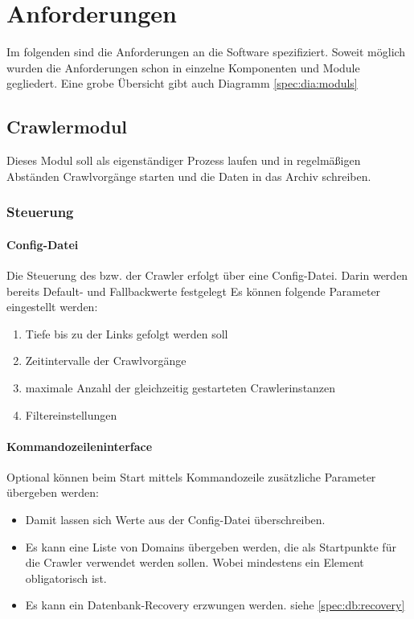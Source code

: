 \chapter{Anforderungen}
Im folgenden sind die Anforderungen an die Software spezifiziert. Soweit möglich wurden
die Anforderungen schon in einzelne Komponenten und Module gegliedert. Eine grobe Übersicht gibt auch Diagramm \ref{spec:dia:moduls}
\section{Crawlermodul}
Dieses Modul soll als eigenständiger Prozess laufen und in regelmäßigen Abständen Crawlvorgänge starten
und die Daten in das Archiv schreiben.

\subsection{Steuerung} \label{spec:req:crawler:control}
	\subsubsection{Config-Datei} \label{spec:req:crawler:control:config} 
		Die Steuerung des bzw. der Crawler erfolgt über eine Config-Datei.
		Darin werden bereits Default- und Fallbackwerte festgelegt  
		Es können folgende Parameter eingestellt werden:
		\begin{enumerate}
			\item Tiefe bis zu der Links gefolgt werden soll
			\item Zeitintervalle der Crawlvorgänge
			\item maximale Anzahl der gleichzeitig gestarteten Crawlerinstanzen
			\item Filtereinstellungen
		\end{enumerate}
	\subsubsection{Kommandozeileninterface} \label{spec:req:crawler:control:cmd} 
		Optional können beim Start mittels Kommandozeile zusätzliche Parameter übergeben werden:
		\begin{itemize}
			\item Damit lassen sich Werte aus der Config-Datei überschreiben.
			\item Es kann eine Liste von Domains übergeben werden, die als Startpunkte für die Crawler verwendet werden sollen.
				Wobei mindestens ein Element obligatorisch ist.
			\item Es kann ein Datenbank-Recovery erzwungen werden. siehe \ref{spec:db:recovery}
		\end{itemize}
